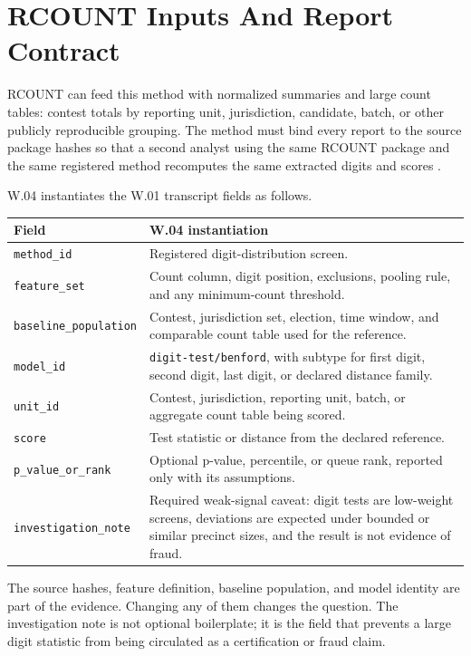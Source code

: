\section{RCOUNT Inputs And Report Contract}

RCOUNT can feed this method with normalized summaries and large count tables:
contest totals by reporting unit, jurisdiction, candidate, batch, or other
publicly reproducible grouping. The method must bind every report to the source
package hashes so that a second analyst using the same RCOUNT package and the
same registered method recomputes the same extracted digits and scores
\citep{rcount-overview-2026}.

W.04 instantiates the W.01 transcript fields as follows.

\begin{center}
\small
\begin{tabularx}{\textwidth}{lX}
\toprule
Field & W.04 instantiation \\
\midrule
\texttt{method\_id} & Registered digit-distribution screen. \\
\texttt{feature\_set} & Count column, digit position, exclusions, pooling rule,
and any minimum-count threshold. \\
\texttt{baseline\_population} & Contest, jurisdiction set, election, time window,
and comparable count table used for the reference. \\
\texttt{model\_id} & \texttt{digit-test/benford}, with subtype for first digit,
second digit, last digit, or declared distance family. \\
\texttt{unit\_id} & Contest, jurisdiction, reporting unit, batch, or aggregate
count table being scored. \\
\texttt{score} & Test statistic or distance from the declared reference. \\
\texttt{p\_value\_or\_rank} & Optional p-value, percentile, or queue rank, reported
only with its assumptions. \\
\texttt{investigation\_note} & Required weak-signal caveat: digit tests are
low-weight screens, deviations are expected under bounded or similar precinct
sizes, and the result is not evidence of fraud. \\
\bottomrule
\end{tabularx}
\end{center}

The source hashes, feature definition, baseline population, and model identity
are part of the evidence. Changing any of them changes the question. The
investigation note is not optional boilerplate; it is the field that prevents a
large digit statistic from being circulated as a certification or fraud claim.
